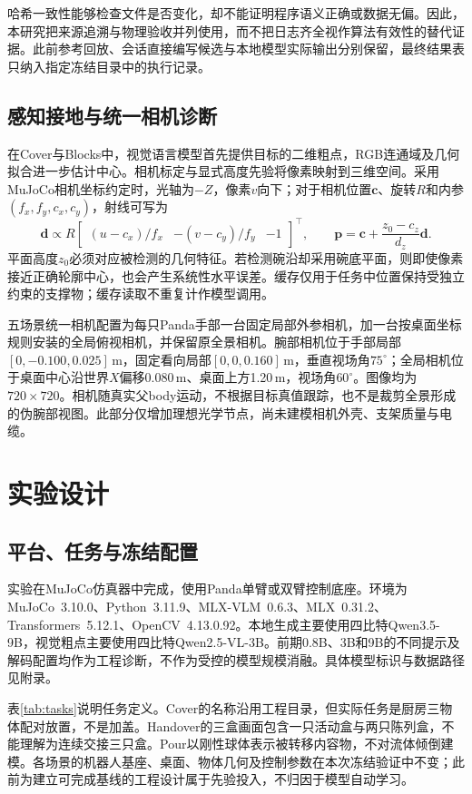 \documentclass[UTF8,zihao=-4,fontset=fandol,a4paper]{ctexart}
\begin{document}
哈希一致性能够检查文件是否变化，却不能证明程序语义正确或数据无偏。因此，本研究把来源追溯与物理验收并列使用，而不把日志齐全视作算法有效性的替代证据。此前参考回放、会话直接编写候选与本地模型实际输出分别保留，最终结果表只纳入指定冻结目录中的执行记录。

\subsection{感知接地与统一相机诊断}
在Cover与Blocks中，视觉语言模型首先提供目标的二维粗点，RGB连通域及几何拟合进一步估计中心。相机标定与显式高度先验将像素映射到三维空间。采用MuJoCo相机坐标约定时，光轴为$-Z$，像素$v$向下；对于相机位置$\bm c$、旋转$R$和内参$(f_x,f_y,c_x,c_y)$，射线可写为
\begin{equation}
\bm d\propto R\begin{bmatrix}(u-c_x)/f_x&-(v-c_y)/f_y&-1\end{bmatrix}^{\!\top},\qquad
\bm p=\bm c+\frac{z_0-c_z}{d_z}\bm d.
\label{eq:ray}
\end{equation}
平面高度$z_0$必须对应被检测的几何特征。若检测碗沿却采用碗底平面，则即使像素接近正确轮廓中心，也会产生系统性水平误差。缓存仅用于任务中位置保持受独立约束的支撑物；缓存读取不重复计作模型调用。

五场景统一相机配置为每只Panda手部一台固定局部外参相机，加一台按桌面坐标规则安装的全局俯视相机，并保留原全景相机。腕部相机位于手部局部$[0,-0.100,0.025]$\,m，固定看向局部$[0,0,0.160]$\,m，垂直视场角$75^\circ$；全局相机位于桌面中心沿世界$X$偏移0.080\,m、桌面上方1.20\,m，视场角$60^\circ$。图像均为$720\times720$。相机随真实父body运动，不根据目标真值跟踪，也不是裁剪全景形成的伪腕部视图。此部分仅增加理想光学节点，尚未建模相机外壳、支架质量与电缆。

\section{实验设计}
\subsection{平台、任务与冻结配置}
实验在MuJoCo仿真器\cite{mujoco2012}中完成，使用Panda单臂或双臂控制底座。环境为MuJoCo~3.10.0、Python~3.11.9、MLX-VLM~0.6.3、MLX~0.31.2、Transformers~5.12.1、OpenCV~4.13.0.92。本地生成主要使用四比特Qwen3.5-9B\cite{qwen35}，视觉粗点主要使用四比特Qwen2.5-VL-3B。前期0.8B、3B和9B的不同提示及解码配置均作为工程诊断，不作为受控的模型规模消融。具体模型标识与数据路径见附录。

表\ref{tab:tasks}说明任务定义。Cover的名称沿用工程目录，但实际任务是厨房三物体配对放置，不是加盖。Handover的三盒画面包含一只活动盒与两只陈列盒，不能理解为连续交接三只盒。Pour以刚性球体表示被转移内容物，不对流体倾倒建模。各场景的机器人基座、桌面、物体几何及控制参数在本次冻结验证中不变；此前为建立可完成基线的工程设计属于先验投入，不归因于模型自动学习。
\end{document}
